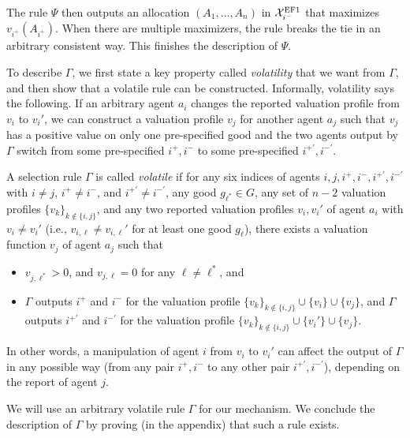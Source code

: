 The rule $\Psi$ then outputs an allocation $(A_1,\ldots,A_n)$ in $\mathcal{X}^{\mathrm{EF1}}_{i^-}$ that maximizes $v_{i^+}(A_{i^+})$.
When there are multiple maximizers, the rule breaks the tie in an arbitrary consistent way.
This finishes the description of $\Psi$.

To describe $\Gamma$, we first state a key property called \emph{volatility} that we want from $\Gamma$, and then show that a volatile rule can be constructed.
Informally, volatility says the following.
If an arbitrary agent $a_i$ changes the reported valuation profile from $v_i$ to $v_i'$, we can construct a valuation profile $v_j$ for another agent $a_j$ such that $v_j$ has a positive value on only one pre-specified good and the two agents output by $\Gamma$ switch from some pre-specified $i^+,i^-$ to some pre-specified $i^{+'},i^{-'}$.

\begin{definition}
A selection rule $\Gamma$ is called \emph{volatile}
if 
for any six indices of agents $i,j,i^+,i^-,i^{+'},i^{-'}$ with $i\neq j$, $i^+\neq i^-$, and $i^{+'}\neq i^{-'}$, any good $g_{\ell^\ast}\in G$, any set of $n-2$ valuation profiles $\{v_k\}_{k\notin \{i,j\}}$, and any two reported valuation profiles $v_i,v_i'$ of agent $a_i$ with $v_i\neq v_i'$ (i.e., $v_{i,\ell}\neq v_{i,\ell}'$ for at least one good $g_{\ell}$), there exists a valuation function $v_j$ of agent $a_j$ such that
\begin{itemize}
    \item $v_{j,\ell^\ast}>0$, and $v_{j,\ell}=0$ for any $\ell\neq\ell^\ast$, and
    \item $\Gamma$ outputs $i^+$ and $i^-$ for the valuation profile $\{v_k\}_{k\notin\{i,j\}}\cup\{v_i\}\cup\{v_j\}$, and $\Gamma$ outputs $i^{+'}$ and $i^{-'}$ for the valuation profile $\{v_k\}_{k\notin\{i,j\}}\cup\{v_i'\}\cup\{v_j\}$.
\end{itemize}
\end{definition}
In other words, a manipulation of agent $i$ from $v_i$ to $v_i'$ can affect the output of $\Gamma$ in any possible way (from any pair $i^+,i^-$ to any other pair $i^{+'},i^{-'}$), depending on the report of agent $j$.

We will use an arbitrary volatile rule $\Gamma$ for our mechanism.
We conclude the description of $\Gamma$ by proving (in the appendix) that such a rule exists.


